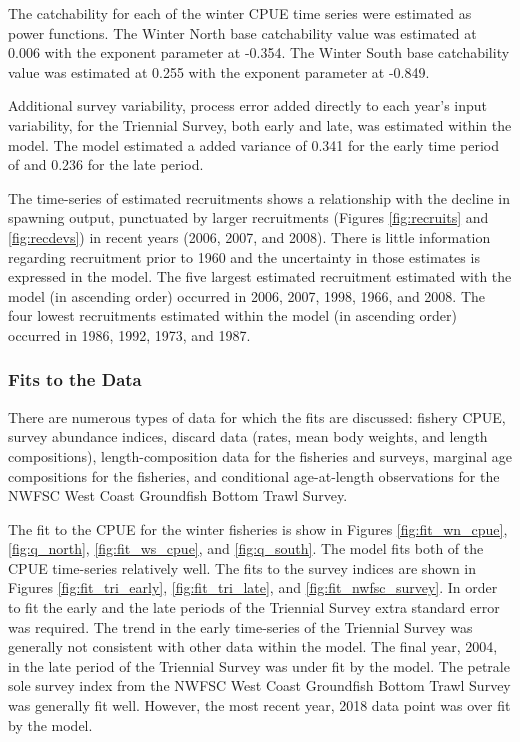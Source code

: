 \documentclass[12pt,]{article}
\begin{document}
The catchability for each of the winter CPUE time series were estimated
as power functions. The Winter North base catchability value was
estimated at 0.006 with the exponent parameter at -0.354. The Winter
South base catchability value was estimated at 0.255 with the exponent
parameter at -0.849.

Additional survey variability, process error added directly to each
year's input variability, for the Triennial Survey, both early and late,
was estimated within the model. The model estimated a added variance of
0.341 for the early time period of and 0.236 for the late period.

The time-series of estimated recruitments shows a relationship with the
decline in spawning output, punctuated by larger recruitments (Figures
\ref{fig:recruits} and \ref{fig:recdevs}) in recent years (2006, 2007,
and 2008). There is little information regarding recruitment prior to
1960 and the uncertainty in those estimates is expressed in the model.
The five largest estimated recruitment estimated with the model (in
ascending order) occurred in 2006, 2007, 1998, 1966, and 2008. The four
lowest recruitments estimated within the model (in ascending order)
occurred in 1986, 1992, 1973, and 1987.

\subsubsection{Fits to the Data}\label{fits-to-the-data}

There are numerous types of data for which the fits are discussed:
fishery CPUE, survey abundance indices, discard data (rates, mean body
weights, and length compositions), length-composition data for the
fisheries and surveys, marginal age compositions for the fisheries, and
conditional age-at-length observations for the NWFSC West Coast
Groundfish Bottom Trawl Survey.

The fit to the CPUE for the winter fisheries is show in Figures
\ref{fig:fit_wn_cpue}, \ref{fig:q_north}, \ref{fig:fit_ws_cpue}, and
\ref{fig:q_south}. The model fits both of the CPUE time-series
relatively well. The fits to the survey indices are shown in Figures
\ref{fig:fit_tri_early}, \ref{fig:fit_tri_late}, and
\ref{fig:fit_nwfsc_survey}. In order to fit the early and the late
periods of the Triennial Survey extra standard error was required. The
trend in the early time-series of the Triennial Survey was generally not
consistent with other data within the model. The final year, 2004, in
the late period of the Triennial Survey was under fit by the model. The
petrale sole survey index from the NWFSC West Coast Groundfish Bottom
Trawl Survey was generally fit well. However, the most recent year, 2018
data point was over fit by the model.
\end{document}
